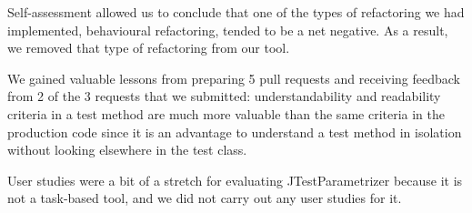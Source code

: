 Self-assessment allowed us to conclude that one of the types of refactoring we had implemented, behavioural refactoring, tended to be a net negative. As a result, we removed that type of refactoring from our tool.

We gained valuable lessons from preparing 5 pull requests and receiving feedback from 2 of the 3 requests that we submitted: understandability and readability criteria in a test method are much more valuable than the same criteria in the production code since it is an advantage to understand a test method in isolation without looking elsewhere in the test class. 

User studies were a bit of a stretch for evaluating JTestParametrizer because it is not a task-based tool, and we did not carry out any user studies for it.






